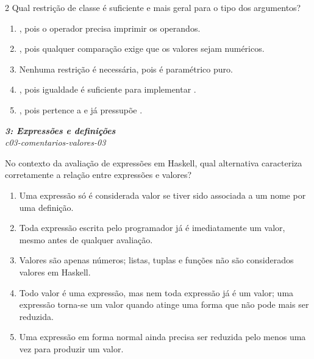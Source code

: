 \documentclass[a4paper,10pt,brazil]{article}
\begin{document}
\begin{multicols}{2}
Qual restrição de classe é suficiente e mais geral para o tipo dos argumentos?

\begin{enumerate}
  \item {}, pois o operador \haskellinline{(&&)} precisa imprimir os operandos.
  \item {}, pois qualquer comparação exige que os valores sejam numéricos.
  \item Nenhuma restrição é necessária, pois \haskellinline{(<=)} é paramétrico puro.
  \item {}, pois igualdade é suficiente para implementar \haskellinline{(<=)}.
  \item {}, pois \haskellinline{(<=)} pertence a  e  já pressupõe .

\end{enumerate}

\begin{flushright}
  \footnotesize
  \textit{\textbf{3: Expressões e definições}}\\
  \textit{c03-comentarios-valores-03}\\

\end{flushright}
No contexto da avaliação de expressões em Haskell, qual alternativa caracteriza corretamente a relação entre expressões e valores?

\begin{enumerate}
  \item Uma expressão só é considerada valor se tiver sido associada a um nome por uma definição.

  \item Toda expressão escrita pelo programador já é imediatamente um valor, mesmo antes de qualquer avaliação.

  \item Valores são apenas números; listas, tuplas e funções não são considerados valores em Haskell.

  \item Todo valor é uma expressão, mas nem toda expressão já é um valor; uma expressão torna-se um valor quando atinge uma forma que não pode mais ser reduzida.

  \item Uma expressão em forma normal ainda precisa ser reduzida pelo menos uma vez para produzir um valor.



\end{enumerate}
\end{multicols}
\end{document}

